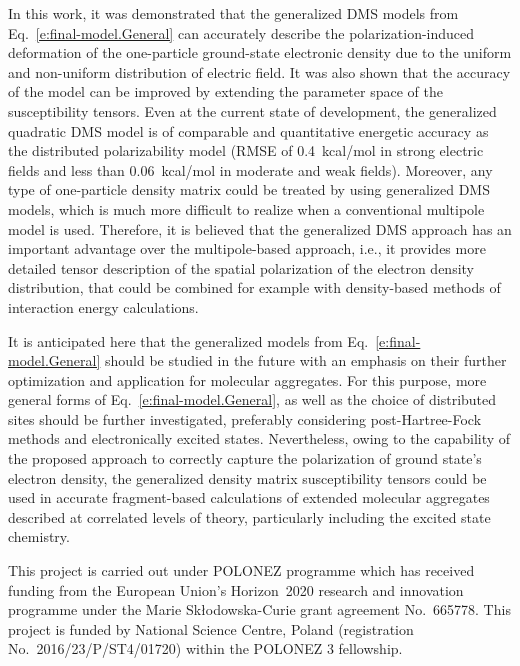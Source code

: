 \documentclass[aip,jcp,preprint,amsmath,amssymb,floatfix]{revtex4-1}
\begin{document}
In this work, it was demonstrated that the generalized DMS models from Eq.~\eqref{e:final-model.General}
can accurately describe the polarization\hyp{}induced deformation 
of the one\hyp{}particle ground\hyp{}state electronic density
due to the uniform and non\hyp{}uniform distribution of electric field.
It was also shown that the accuracy of the model can be improved 
by extending the parameter space of the susceptibility tensors.
Even at the current state of development, the generalized quadratic DMS model
is of comparable and quantitative energetic accuracy as the distributed 
polarizability model (RMSE of 0.4~kcal/mol in strong 
electric fields and less than 0.06~kcal/mol in moderate and weak fields).
Moreover, any type of one\hyp{}particle density matrix could be treated by using
generalized DMS models, which is much more difficult to realize when a conventional multipole
model is used. Therefore, it is believed that the generalized DMS approach
has an important advantage over the multipole\hyp{}based approach, i.e., it provides more detailed
tensor description of the spatial polarization of the electron density distribution, that could be
combined for example with density\hyp{}based methods of interaction energy calculations.\cite{Mandado.Hermida-Ramon.JCTC.2011}

It is anticipated here that the generalized models from Eq.~\eqref{e:final-model.General}
should be studied in the future with an emphasis 
on their further optimization and application for molecular aggregates.
For this purpose, more general forms of Eq.~\eqref{e:final-model.General}, 
as well as the choice of distributed
sites should be further investigated, preferably considering post\hyp{}Hartree\hyp{}Fock methods
and electronically excited states.
Nevertheless, owing to the capability of the proposed approach to correctly capture the 
polarization of ground state's electron density,
the generalized density matrix susceptibility tensors 
could be used in accurate fragment\hyp{}based calculations of extended molecular aggregates
described at correlated levels of theory, particularly including the excited state chemistry.

\begin{acknowledgments}
This project is carried out under POLONEZ programme which has received funding from the European Union's
Horizon~2020 research and innovation programme under the Marie Skłodowska-Curie grant agreement 
No.~665778. This project is funded by National Science Centre, Poland 
(registration No.~2016/23/P/ST4/01720) within the POLONEZ 3 fellowship. 
\end{acknowledgments}
\end{document}
